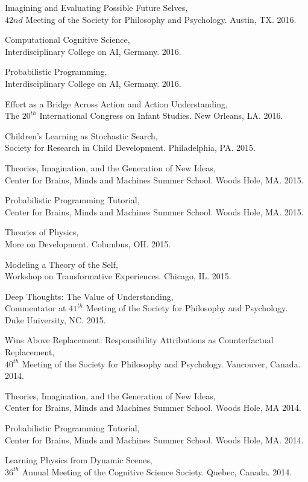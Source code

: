 \documentclass[margin,line,pifont,palatino,courier]{res}
\begin{document}
\begin{resume}
Imagining and Evaluating Possible Future Selves, \\ $42nd$ Meeting of the Society for Philosophy and Psychology. Austin, TX. 2016.

Computational Cognitive Science,\\ Interdisciplinary College on AI, Germany. 2016. 

Probabilistic Programming,\\ Interdisciplinary College on AI, Germany. 2016. 

Effort as a Bridge Across Action and Action Understanding,\\
The $20^{th}$ International Congress on Infant Studies. New Orleans, LA. 2016.

Children's Learning as Stochastic Search, \\Society for Research in Child Development. Philadelphia, PA. 2015.

Theories, Imagination, and the Generation of New Ideas, \\Center for Brains, Minds and Machines Summer School. Woods Hole, MA. 2015.

Probabilistic Programming Tutorial, \\ Center for Brains, Minds and Machines Summer School. Woods Hole, MA. 2015.

Theories of Physics, \\More on Development. Columbus, OH. 2015.

Modeling a Theory of the Self, \\Workshop on Transformative Experiences. Chicago, IL. 2015.

Deep Thoughts: The Value of Understanding,\\ Commentator at $41^{th}$ Meeting of the Society for Philosophy and Psychology. Duke University, NC. 2015.

Wins Above Replacement: Responsibility Attributions as Counterfactual Replacement,\\ $40^{th}$ Meeting of the Society for Philosophy and Psychology. Vancouver, Canada. 2014.

Theories, Imagination, and the Generation of New Ideas, \\Center for Brains, Minds and Machines Summer School. Woods Hole, MA 2014.

Probabilistic Programming Tutorial, \\ Center for Brains, Minds and Machines Summer School. Woods Hole, MA. 2014.

Learning Physics from Dynamic Scenes, \\$36^{th}$ Annual Meeting of the Cognitive Science Society. Quebec, Canada. 2014.


\end{resume}
\end{document}
